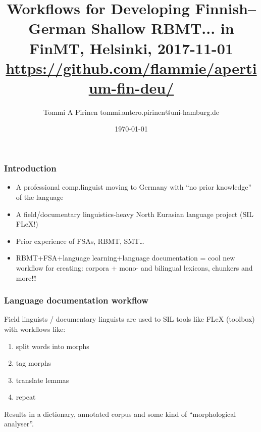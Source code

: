 \documentclass{beamer}
\title{Workflows for Developing Finnish–German Shallow RBMT...
\scriptsize{in FinMT, Helsinki, 2017-11-01\\
\url{https://github.com/flammie/apertium-fin-deu/}}}
\author{Tommi A Pirinen \scriptsize \guilsinglleft tommi.antero.pirinen@uni-hamburg.de \guilsinglright }
\institute{HZSK.de, de.CLARIN.eu, etc.}
\date{\today}
\newcommand{\hand}{\ding{43}}
\begin{document}

\maketitle

\begin{frame}
    \frametitle{Introduction}
    \begin{itemize}
        \item A professional comp.linguist moving to Germany with ``no prior
            knowledge'' of the language
        \item A field/documentary linguistics-heavy North Eurasian language
            project (SIL FLeX!)
        \item Prior experience of FSAs, RBMT, SMT\ldots
        \item \hand RBMT+FSA+language learning+language documentation =
            cool new workflow for creating: corpora + mono- and bilingual
            lexicons, chunkers and more\textbf{!!}
    \end{itemize}
\end{frame}

\begin{frame}
    \frametitle{Language documentation workflow}
    Field linguists / documentary linguists are used to SIL tools like
    FLeX (toolbox) with workflows like:
    \begin{enumerate}
        \item split words into morphs
        \item tag morphs
        \item translate lemmas
        \item repeat
    \end{enumerate}
    Results in a dictionary, annotated corpus and some kind of ``morphological
    analyser''.
\end{frame}
\end{document}
